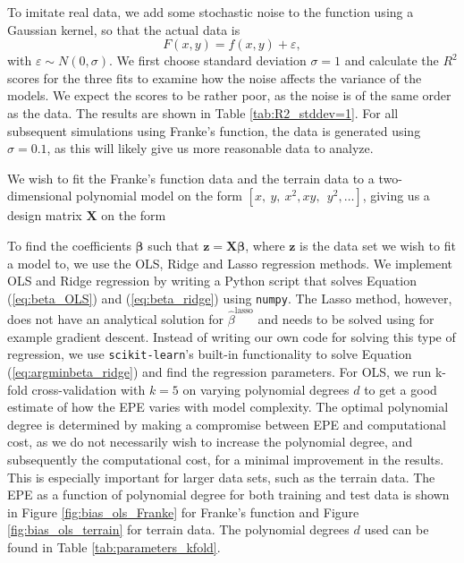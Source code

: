 \documentclass[a4paper, 10pt]{article}
\begin{document}
\begin{multicols}{2}
To imitate real data, we add some stochastic noise to the function using a Gaussian kernel, so that the actual data is
\begin{equation}
F(x, y) = f(x, y) + \varepsilon \label{eq:Frankenoise},
\end{equation}
with $ \varepsilon \sim N(0, \sigma) $. We first choose standard deviation $\sigma=1$ and calculate the $R^2$ scores for the three fits to examine how the noise affects the variance of the models. We expect the scores to be rather poor, as the noise is of the same order as the data.  The results are shown in Table \ref{tab:R2_stddev=1}. For all subsequent simulations using Franke's function, the data is generated using $\sigma=0.1$, as this will likely give us more reasonable data to analyze.

We wish to fit the Franke's function data and the terrain data to a two-dimensional polynomial model on the form $[x,\ y,\ x^2, xy,\ \ y^2, \dots]$,  giving us a design matrix $\bm{X}$ on the form \\

\setlength{\arraycolsep}{1.5pt}
\noindent
{}
\vspace{1pt}

\noindent
To find the coefficients $\bm{\beta}$ such that $\bm{ z} = \bm{X \beta} $, where $\bm{z}$ is the data set we wish to fit a model to, we use the OLS, Ridge and Lasso regression methods.
We implement OLS and Ridge regression by writing a Python script that solves Equation (\ref{eq:beta_OLS}) and (\ref{eq:beta_ridge}) using \texttt{numpy}. The Lasso method, however, does not have an analytical solution for $\hat{\beta}^\text{lasso}$ and needs to be solved using for example gradient descent. Instead of writing our own code for solving this type of regression, we use \texttt{scikit-learn}'s built-in functionality to solve Equation (\ref{eq:argminbeta_ridge}) and find the regression parameters.
\noindent
For OLS, we run k-fold cross-validation with $k=5$ on varying polynomial degrees $d$ to get a good estimate of how the EPE varies with model complexity. The optimal polynomial degree is determined by making a compromise between EPE and computational cost, as we do not necessarily wish to increase the polynomial degree, and subsequently the computational cost, for a minimal improvement in the results. This is especially important for larger data sets, such as the terrain data. The EPE as a function of polynomial degree for both training and test data is shown in Figure \ref{fig:bias_ols_Franke} for Franke's function and Figure \ref{fig:bias_ols_terrain} for terrain data. The polynomial degrees $d$ used can be found in Table \ref{tab:parameters_kfold}.


\end{multicols}
\end{document}
